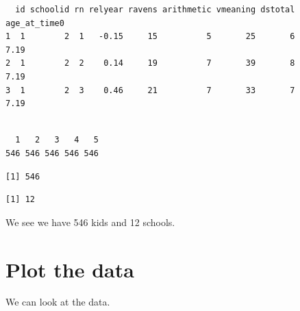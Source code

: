 \documentclass[
  letterpaper,
  DIV=11,
  numbers=noendperiod]{scrreprt}
\newenvironment{Shaded}{\begin{snugshade}}{\end{snugshade}}
\newcommand{\CommentTok}[1]{\textcolor[rgb]{0.38,0.63,0.69}{\textit{#1}}}
\newcommand{\FunctionTok}[1]{\textcolor[rgb]{0.02,0.16,0.49}{#1}}
\newcommand{\NormalTok}[1]{\textcolor[rgb]{0.00,0.44,0.13}{#1}}
\newcommand{\SpecialCharTok}[1]{\textcolor[rgb]{0.25,0.44,0.63}{#1}}
\begin{document}
\begin{verbatim}
  id schoolid rn relyear ravens arithmetic vmeaning dstotal age_at_time0
1  1        2  1   -0.15     15          5       25       6         7.19
2  1        2  2    0.14     19          7       39       8         7.19
3  1        2  3    0.46     21          7       33       7         7.19
\end{verbatim}

\begin{Shaded}
\end{Shaded}

\begin{verbatim}

  1   2   3   4   5 
546 546 546 546 546 
\end{verbatim}

\begin{Shaded}
\end{Shaded}

\begin{verbatim}
[1] 546
\end{verbatim}

\begin{Shaded}
\end{Shaded}

\begin{verbatim}
[1] 12
\end{verbatim}

We see we have 546 kids and 12 schools.

\hypertarget{plot-the-data-1}{%
\section{Plot the data}\label{plot-the-data-1}}

We can look at the data.
\end{document}
